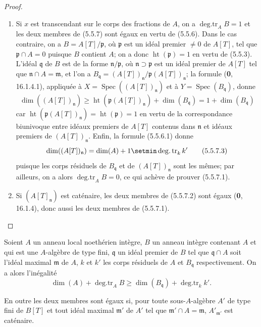 \begin{proof}
\begin{enumerate}
\item[(i)] Si $x$ est transcendant sur le corps des fractions de $A$, on a
$\operatorname{deg.tr}_A B=1$ et les deux membres de (5.5.7) sont égaux en
vertu de (5.5.6). Dans le cas contraire, on a $B=A[T]/\mathfrak p$, où
$\mathfrak p$ est un idéal premier $\ne0$ de $A[T]$, tel que
$\mathfrak p\cap A=0$ puisque $B$ contient $A$; on a donc
$\operatorname{ht}(\mathfrak p)=1$ en vertu de (5.5.3). L'idéal
$\mathfrak q$ de $B$ est de la forme $\mathfrak n/\mathfrak p$, où
$\mathfrak n\supset\mathfrak p$ est un idéal premier de $A[T]$ tel que
$\mathfrak n\cap A=\mathfrak m$, et l'on a
$B_{\mathfrak q}=(A[T])_{\mathfrak n}/\mathfrak p(A[T])_{\mathfrak n}$;
la formule (\textbf{0}, 16.1.4.1), appliquée à
$X=\operatorname{Spec}((A[T])_{\mathfrak n})$ et à
$Y=\operatorname{Spec}(B_{\mathfrak q})$, donne
\begin{equation}
\dim((A[T])_{\mathfrak n})
\geq\operatorname{ht}(\mathfrak p(A[T])_{\mathfrak n})
+\dim(B_{\mathfrak q})=1+\dim(B_{\mathfrak q})
\tag{5.5.7.2}\label{IV.2.s5.5.7.2-fr}
\end{equation}
car $\operatorname{ht}(\mathfrak p(A[T])_{\mathfrak n})
=\operatorname{ht}(\mathfrak p)=1$ en vertu de la correspondance biunivoque
entre idéaux premiers de $A[T]$ contenus dans $\mathfrak n$ et idéaux
premiers de $(A[T])_{\mathfrak n}$. Enfin, la formule (5.5.6.1) donne
\begin{equation}
\dim((A[T])_{\mathfrak n})
=\dim(A)+1\setmin\operatorname{deg.tr}_k k'
\tag{5.5.7.3}\label{IV.2.s5.5.7.3-fr}
\end{equation}
puisque les corps résiduels de $B_{\mathfrak q}$ et de
$(A[T])_{\mathfrak n}$ sont les mêmes; par ailleurs, on a alors
$\operatorname{deg.tr}_A B=0$, ce qui achève de prouver (5.5.7.1).
\item[(ii)] Si $(A[T]_{\mathfrak n})$ est caténaire, les deux membres de
(5.5.7.2) sont égaux (\textbf{0}, 16.1.4), donc aussi les deux membres de (5.5.7.1).
\end{enumerate}
\end{proof}

\begin{theorem}
\label{IV.2.s5.5.8-fr}
Soient $A$ un anneau local noethérien intègre, $B$ un anneau intègre contenant
$A$ et qui est une $A$-algèbre de type fini, $\mathfrak q$ un idéal premier
de $B$ tel que $\mathfrak q\cap A$ soit l'idéal maximal $\mathfrak m$ de
$A$, $k$ et $k'$ les corps résiduels de $A$ et $B_{\mathfrak q}$
respectivement. On a alors l'inégalité
\begin{equation}
\dim(A)+\operatorname{deg.tr}_A B
\geq\dim(B_{\mathfrak q})+\operatorname{deg.tr}_k k'.
\tag{5.5.8.1}\label{IV.2.s5.5.8.1-fr}
\end{equation}

En outre les deux membres sont égaux si, pour toute sous-$A$-algèbre $A'$ de
type fini de $B[T]$ et tout idéal maximal $\mathfrak m'$ de $A'$ tel que
$\mathfrak m'\cap A=\mathfrak m$, $A'_{\mathfrak m'}$ est caténaire.
\end{theorem}

